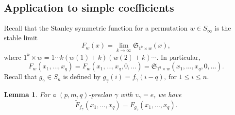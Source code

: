 \documentclass[12pt,reqno]{amsart}
\numberwithin{equation}{section}
\newtheorem{lemma}[theorem]{Lemma}
\theoremstyle{definition}
\begin{document}
\subsection{Application to simple coefficients}

Recall that the Stanley symmetric function for a permutation $w\in S_\infty$ is the stable limit 
$$
F_w(x) = 
\lim_{k\to \infty} \mathfrak{S}_{1^k\times w}(x),$$
where $1^k\times w=1\cdots k(w(1)+k)(w(2)+k)\cdots$. In particular, 
$$F_w(x_1,\ldots,x_q) = F_w(x_1,\ldots,x_q,0,\ldots)
= \mathfrak{S}_{1^q\times w}(x_1,\ldots,x_q,0,\ldots).
$$
Recall that $g_\gamma\in S_n$ is defined by $g_\gamma(i)=f_\gamma(i-q),\ \text{for $1\le i\le n$}.$



\begin{lemma}\label{lem:affinestanley}
For  a $(p,m,q)$-preclan $\gamma$ with $v_\gamma=e$, we have 
$$\widetilde{F}_{f_\gamma}(x_1,\ldots,x_q)
= F_{g_\gamma}(x_1,\ldots,x_q). $$
\end{lemma}
\end{document}

